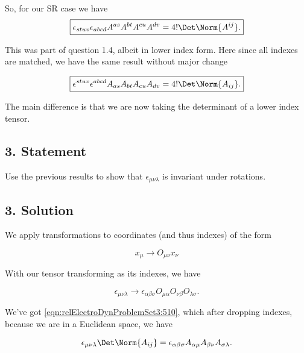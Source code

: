 So, for our SR case we have
\begin{equation}\label{eqn:relElectroDynProblemSet3:640}
\boxed{
\epsilon_{s t u v} \epsilon_{a b c d} A^{a s} A^{b t} A^{c u} A^{d v}= 4! \Det \Norm{A^{ij}}.
}
\end{equation}

This was part of question 1.4, albeit in lower index form.  Here since all indexes are matched, we have the same result without major change

\begin{equation}\label{eqn:relElectroDynProblemSet3:660}
\boxed{
\epsilon^{s t u v} \epsilon^{a b c d} A_{a s} A_{b t} A_{c u} A_{d v}= 4! \Det \Norm{A_{ij}}.
}
\end{equation}

The main difference is that we are now taking the determinant of a lower index tensor.

\subsection{3. Statement}

Use the previous results to show that $\epsilon_{\mu\nu\lambda}$ is invariant under rotations.

\subsection{3. Solution}

We apply transformations to coordinates (and thus indexes) of the form

\begin{equation}\label{eqn:relElectroDynProblemSet3:680}
x_\mu \rightarrow O_{\mu\nu} x_\nu
\end{equation}

With our tensor transforming as its indexes, we have

\begin{equation}\label{eqn:relElectroDynProblemSet3:700}
\epsilon_{\mu\nu\lambda} \rightarrow \epsilon_{\alpha\beta\sigma} O_{\mu\alpha} O_{\nu\beta} O_{\lambda\sigma}.
\end{equation}

We've got \ref{eqn:relElectroDynProblemSet3:510}, which after dropping indexes, because we are in a Euclidean space, we have

\begin{equation}\label{eqn:relElectroDynProblemSet3:510b}
\epsilon_{\mu \nu \lambda} \Det \Norm{A_{ij}} = \epsilon_{\alpha \beta \sigma} A_{\alpha \mu} A_{\beta \nu} A_{\sigma \lambda}.
\end{equation}

